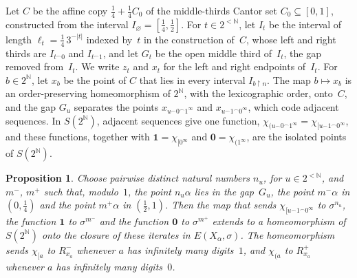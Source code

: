 \documentclass[psamsfonts]{amsart}
\newtheorem{prop}[thm]{Proposition}
\theoremstyle{definition}
\theoremstyle{remark}
\newcommand{\restr}{{\restriction}}
\numberwithin{equation}{section}
\begin{document}
Let $C$ be the affine copy $\frac14+\frac14C_0$ of the middle-thirds Cantor set $C_0\subseteq[0,1]$, constructed from the interval $I_\varnothing=[\frac14,\frac12]$.
For $t\in2^{<\mathbb{N}}$, let $I_t$ be the interval of length $\ell_t=\frac14\,3^{-|t|}$ indexed by~$t$ in the construction of~$C$, whose left and right thirds are $I_{t^\frown0}$ and $I_{t^\frown1}$, and let $G_t$ be the open middle third of~$I_t$, the gap removed from~$I_t$.
We write $z_t$ and $x_t$ for the left and right endpoints of~$I_t$.
For $b\in2^{\mathbb{N}}$, let $x_b$ be the point of $C$ that lies in every interval $I_{b\restr n}$.
The map $b\mapsto x_b$ is an order-preserving homeomorphism of $2^{\mathbb{N}}$, with the lexicographic order, onto~$C$, and the gap $G_u$ separates the points $x_{u^\frown0^\frown1^\infty}$ and $x_{u^\frown1^\frown0^\infty}$, which code adjacent sequences.
In $S(2^{\mathbb{N}})$, adjacent sequences give one function, $\chi_{(u^\frown0^\frown1^\infty}=\chi_{[u^\frown1^\frown0^\infty}$, and these functions, together with $\mathbf{1}=\chi_{[0^\infty}$ and $\mathbf{0}=\chi_{(1^\infty}$, are the isolated points of $S(2^{\mathbb{N}})$.

\begin{prop}\label{prop:Bresenham-split}
  Choose pairwise distinct natural numbers $n_u$, for $u\in2^{<\mathbb{N}}$, and $m^-$, $m^+$ such that, modulo~$1$, the point $n_u\alpha$ lies in the gap~$G_u$, the point $m^-\alpha$ in $(0,\frac14)$ and the point $m^+\alpha$ in $(\frac12,1)$.
  Then the map that sends $\chi_{[u^\frown1^\frown0^\infty}$ to $\sigma^{n_u}$, the function $\mathbf{1}$ to $\sigma^{m^-}$ and the function $\mathbf{0}$ to $\sigma^{m^+}$ extends to a homeomorphism of $S(2^{\mathbb{N}})$ onto the closure of these iterates in $E(X_\alpha,\sigma)$.
  The homeomorphism sends $\chi_{[a}$ to $R^-_{x_a}$ whenever $a$ has infinitely many digits~$1$, and $\chi_{(a}$ to $R^+_{x_a}$ whenever $a$ has infinitely many digits~$0$.
\end{prop}
\end{document}
